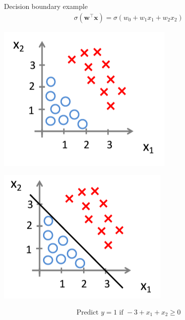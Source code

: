 \documentclass[serif, aspectratio=169]{beamer}
\begin{document}
\begin{frame}{Decision boundary example}
    \begin{align*}
        \sigma (\mathbf{w}^\top \mathbf{x}) = \sigma (w_0 + w_1 x_1 + w_2 x_2)
    \end{align*}
    
    \begin{minipage}{0.35\linewidth}
        \centering
        \includegraphics[width=\linewidth]{pic/lrDB1.png}
    \end{minipage}
    \hfill
    \begin{minipage}{0.35\linewidth}
        \centering
        \includegraphics[width=\linewidth]{pic/lrDB2.png}
    \end{minipage}
    
    \begin{align*}
        \text{Predict } y=1 \text{ if } -3 + x_1 + x_2 \geq 0
    \end{align*}
    
\end{frame}
\end{document}
